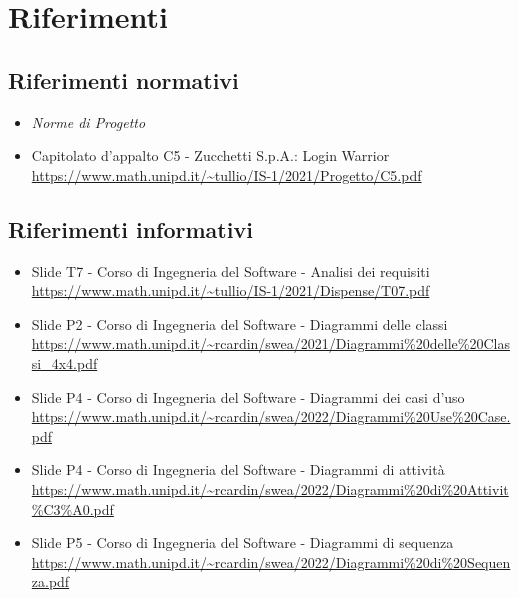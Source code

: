 \section{Riferimenti}
\subsection{Riferimenti normativi}
\begin{itemize}
  \item \textit{Norme di Progetto}
  \item Capitolato d'appalto C5 - Zucchetti S.p.A.: Login Warrior \\
  \url{https://www.math.unipd.it/~tullio/IS-1/2021/Progetto/C5.pdf}
\end{itemize}

\subsection{Riferimenti informativi}
\begin{itemize}
  \item Slide T7 - Corso di Ingegneria del Software - Analisi dei requisiti \\
  \url{https://www.math.unipd.it/~tullio/IS-1/2021/Dispense/T07.pdf}
  \item Slide P2 - Corso di Ingegneria del Software - Diagrammi delle classi \\
  \url{https://www.math.unipd.it/~rcardin/swea/2021/Diagrammi%20delle%20Classi_4x4.pdf}
  \item Slide P4 - Corso di Ingegneria del Software - Diagrammi dei casi d'uso \\
  \url{https://www.math.unipd.it/~rcardin/swea/2022/Diagrammi%20Use%20Case.pdf}
  \item Slide P4 - Corso di Ingegneria del Software - Diagrammi di attività \\
  \url{https://www.math.unipd.it/~rcardin/swea/2022/Diagrammi%20di%20Attivit\%C3\%A0.pdf}  %
  \item Slide P5 - Corso di Ingegneria del Software - Diagrammi di sequenza \\
  \url{https://www.math.unipd.it/~rcardin/swea/2022/Diagrammi%20di%20Sequenza.pdf}
\end{itemize}
